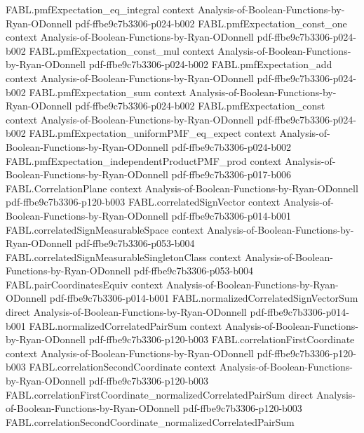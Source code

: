 \begin{theorem}
  {FABL.pmfExpectation_eq_integral}
  {context}
  {Analysis-of-Boolean-Functions-by-Ryan-ODonnell}
  {pdf-ffbe9c7b3306-p024-b002}
\proofstep
  {FABL.pmfExpectation_const_one}
  {context}
  {Analysis-of-Boolean-Functions-by-Ryan-ODonnell}
  {pdf-ffbe9c7b3306-p024-b002}
\proofstep
  {FABL.pmfExpectation_const_mul}
  {context}
  {Analysis-of-Boolean-Functions-by-Ryan-ODonnell}
  {pdf-ffbe9c7b3306-p024-b002}
\proofstep
  {FABL.pmfExpectation_add}
  {context}
  {Analysis-of-Boolean-Functions-by-Ryan-ODonnell}
  {pdf-ffbe9c7b3306-p024-b002}
\proofstep
  {FABL.pmfExpectation_sum}
  {context}
  {Analysis-of-Boolean-Functions-by-Ryan-ODonnell}
  {pdf-ffbe9c7b3306-p024-b002}
\proofstep
  {FABL.pmfExpectation_const}
  {context}
  {Analysis-of-Boolean-Functions-by-Ryan-ODonnell}
  {pdf-ffbe9c7b3306-p024-b002}
\proofstep
  {FABL.pmfExpectation_uniformPMF_eq_expect}
  {context}
  {Analysis-of-Boolean-Functions-by-Ryan-ODonnell}
  {pdf-ffbe9c7b3306-p024-b002}
\proofstep
  {FABL.pmfExpectation_independentProductPMF_prod}
  {context}
  {Analysis-of-Boolean-Functions-by-Ryan-ODonnell}
  {pdf-ffbe9c7b3306-p017-b006}
\proofstep
  {FABL.CorrelationPlane}
  {context}
  {Analysis-of-Boolean-Functions-by-Ryan-ODonnell}
  {pdf-ffbe9c7b3306-p120-b003}
\proofstep
  {FABL.correlatedSignVector}
  {context}
  {Analysis-of-Boolean-Functions-by-Ryan-ODonnell}
  {pdf-ffbe9c7b3306-p014-b001}
\proofstep
  {FABL.correlatedSignMeasurableSpace}
  {context}
  {Analysis-of-Boolean-Functions-by-Ryan-ODonnell}
  {pdf-ffbe9c7b3306-p053-b004}
\proofstep
  {FABL.correlatedSignMeasurableSingletonClass}
  {context}
  {Analysis-of-Boolean-Functions-by-Ryan-ODonnell}
  {pdf-ffbe9c7b3306-p053-b004}
\proofstep
  {FABL.pairCoordinatesEquiv}
  {context}
  {Analysis-of-Boolean-Functions-by-Ryan-ODonnell}
  {pdf-ffbe9c7b3306-p014-b001}
\proofstep
  {FABL.normalizedCorrelatedSignVectorSum}
  {direct}
  {Analysis-of-Boolean-Functions-by-Ryan-ODonnell}
  {pdf-ffbe9c7b3306-p014-b001}
\proofstep
  {FABL.normalizedCorrelatedPairSum}
  {context}
  {Analysis-of-Boolean-Functions-by-Ryan-ODonnell}
  {pdf-ffbe9c7b3306-p120-b003}
\proofstep
  {FABL.correlationFirstCoordinate}
  {context}
  {Analysis-of-Boolean-Functions-by-Ryan-ODonnell}
  {pdf-ffbe9c7b3306-p120-b003}
\proofstep
  {FABL.correlationSecondCoordinate}
  {context}
  {Analysis-of-Boolean-Functions-by-Ryan-ODonnell}
  {pdf-ffbe9c7b3306-p120-b003}
\proofstep
  {FABL.correlationFirstCoordinate_normalizedCorrelatedPairSum}
  {direct}
  {Analysis-of-Boolean-Functions-by-Ryan-ODonnell}
  {pdf-ffbe9c7b3306-p120-b003}
\proofstep
  {FABL.correlationSecondCoordinate_normalizedCorrelatedPairSum}

\end{theorem}
